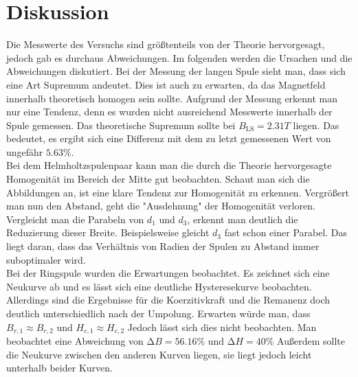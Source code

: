 \section{Diskussion}
\label{sec:Diskussion}

Die Messwerte des Versuchs sind größtenteils von der Theorie hervorgesagt, jedoch gab es durchaus Abweichungen.
Im folgenden werden die Ursachen und die Abweichungen diskutiert.
Bei der Messung der langen Spule sieht man, dass sich eine Art Supremum andeutet.
Dies ist auch zu erwarten, da das Magnetfeld innerhalb theoretisch homogen sein sollte.
Aufgrund der Messung erkennt man nur eine Tendenz, denn es wurden nicht ausreichend Messwerte innerhalb der Spule gemessen.
Das theoretische Supremum sollte bei $B_{\text{LS}} = 2.31 T$ liegen.
Das bedeutet, es ergibt sich eine Differenz mit dem zu letzt gemessenen Wert von ungefähr $5.63\%$. \\

Bei dem Helmholtzspulenpaar kann man die durch die Theorie hervorgesagte Homogenität im Bereich der Mitte gut beobachten.
Schaut man sich die Abbildungen an, ist eine klare Tendenz zur Homogenität zu erkennen.
Vergrößert man nun den Abstand, geht die "Ausdehnung" der Homogenität verloren.
Vergleicht man die Parabeln von $d_{1}$ und $d_{3}$, erkennt man deutlich die Reduzierung dieser Breite.
Beispielsweise gleicht $d_{3}$ fast schon einer Parabel.
Das liegt daran, dass das Verhältnis von Radien der Spulen zu Abstand immer suboptimaler wird.  \\

Bei der Ringspule wurden die Erwartungen beobachtet.
Es zeichnet sich eine Neukurve ab und es lässt sich eine deutliche Hysteresekurve beobachten.
Allerdings sind die Ergebnisse für die Koerzitivkraft und die Remanenz doch deutlich unterschiedlich nach der Umpolung.
Erwarten würde man, dass $B_{r,1} \approx B_{r,2}$ und $H_{c,1} \approx H_{c,2}$
Jedoch lässt sich dies nicht beobachten. 
Man beobachtet eine Abweichung von $\increment B = 56.16 \%$ und  $\increment H = 40 \%$
Außerdem sollte die Neukurve zwischen den anderen Kurven liegen, sie liegt jedoch leicht unterhalb beider Kurven.

\nocite{matplotlib}